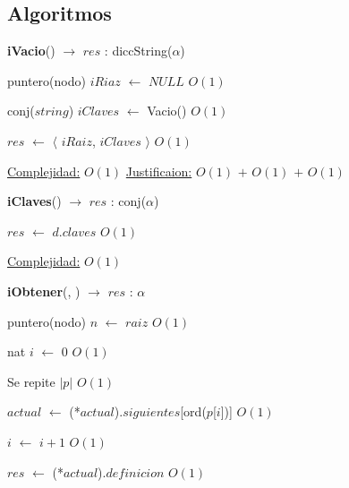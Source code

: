 \begin{Algoritmos}
\subsection{Algoritmos}  
  
\begin{algorithm}[H]
{\textbf{iVacio}() $\to$ $res$ : diccString($\alpha$)}
\begin{algorithmic}[1]

\State puntero(nodo) $iRiaz$ $\gets $ $NULL$  \Comment $O(1)$
 
\State conj($string$) $iClaves$ $\gets$ Vacio() \Comment $O(1)$

\State $res$ $\gets$  $\langle$ $iRaiz$, $iClaves$ $\rangle$ \Comment $O(1)$

\medskip
\State \underline{Complejidad:} $O(1)$
\State \underline{Justificaion:} $O(1)$ $+$ $O(1)$ $+$ $O(1)$

\end{algorithmic}
\end{algorithm}  

\begin{algorithm}[H]
{\textbf{iClaves}(}) $\to$ $res$ : conj($\alpha$)
\begin{algorithmic}[1]

\State $res$ $\gets$ $d$.$claves$ \Comment $O(1)$

\medskip
\State \underline{Complejidad:} $O(1)$

\end{algorithmic}
\end{algorithm}
  
  
  
\begin{algorithm}[H]
{\textbf{iObtener}(, }) $\to$ $res$ : $\alpha$
\begin{algorithmic}[1]

\State puntero(nodo) $n$ $\gets$ $raiz$ \Comment $O(1)$

\State nat $i$ $\gets$ $0$ \Comment $O(1)$


   \Comment Se repite $|p|$ $O(1)$
		

	\State $actual$ $\gets$ (*$actual$).$siguientes$[ord($p$[$i$])] \Comment $O(1)$

	\State $i$ $\gets$ $i + 1$ \Comment $O(1)$
\EndWhile 


\State $res$ $\gets$ (*$actual$).$definicion$ \Comment $O(1)$ 


\end{algorithmic}
\end{algorithm}
\end{Algoritmos}
